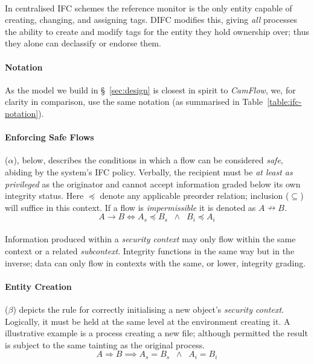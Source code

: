 \paragraph{} In centralised IFC schemes the reference monitor is the only entity capable of creating, changing, and assigning tags. DIFC modifies this, giving \textit{all} processes the ability to create and modify tags for the entity they hold ownership over; thus they alone can declassify or endorse them.

\paragraph{Notation} As the model we build in §~\ref{sec:design} is closest in spirit to \textit{CamFlow}, we, for clarity in comparison, use the same notation (as summarised in Table~\ref{table:ifc-notation}).

\paragraph{Enforcing Safe Flows} ($\alpha$), below, describes the conditions in which a flow can be considered \textit{safe}, abiding by the system's IFC policy. Verbally, the recipient must be \textit{at least as privileged} as the originator and cannot accept information graded below its own integrity status. Here $\preceq$ denote any applicable preorder relation; inclusion ($\subseteq$) will suffice in this context. If a flow is \textit{impermissible} it is denoted as $A \nrightarrow B$.
\begin{equation}
    A \rightarrow B \iff A_s \preceq B_s \;\; \land \;\; B_i \preceq A_i \tag{$\alpha$}
\end{equation}
\paragraph{} Information produced within a \textit{security context} may only flow within the same context or a related \textit{subcontext}. Integrity functions in the same way but in the inverse; data can only flow in contexts with the same, or lower, integrity grading.

\paragraph{Entity Creation} ($\beta$) depicts the rule for correctly initialising a new object's \textit{security context}. Logically, it must be held at the same level at the environment creating it. A illustrative example is a process creating a new file; although permitted the result is subject to the same tainting as the original process.
\begin{equation}
    A \Rightarrow B \implies A_s = B_s \;\; \land \;\; A_i = B_i \tag{$\beta$}
\end{equation}

